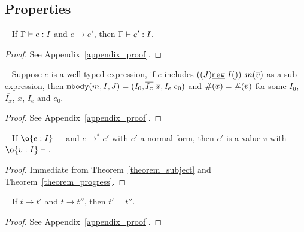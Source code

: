 \subsection{Properties}
\begin{theorem}~\label{theorem_subject}
If $\Gamma \; {\vdash} \; e : I$ and $e \rightarrow e'$, 
then $\Gamma \; {\vdash} \; e' : I$.
\end{theorem}
\begin{proof}
See Appendix~\ref{appendix_proof}.
\end{proof}

\begin{theorem}[Progress]~\label{theorem_progress}
Suppose $e$ is a well-typed expression, if $e$ includes 
$\left((J)\emph{\texttt{new}}\;I()\right).m(\overline{v})$ as a sub-expression, then $\texttt{mbody}(m, I, J) = (I_0, \overline{I_x} \; \overline{x}, I_e\; e_0)$ and $\#(\overline{x}) = \#(\overline{v})$ for some $I_0$, $\overline{I_x}$, $\overline{x}$, $I_e$ and $e_0$.
\end{theorem}
\begin{proof}
See Appendix~\ref{appendix_proof}.
\end{proof}

\begin{theorem}~\label{theorem_soundness}
If $\judgeewf \o {e : I}$ and $e \to^* e'$ with $e'$ a normal form, then $e'$ is 
a value $v$ with $\judgeewf \o {v:I}$.
\end{theorem}
\begin{proof}
Immediate from Theorem~\ref{theorem_subject} and Theorem~\ref{theorem_progress}.
\end{proof}

\begin{theorem}~\label{theorem_determinacy}
	If $t \to t'$ and $t \to t''$, then $t' = t''$.
\end{theorem}
\begin{proof}
See Appendix~\ref{appendix_proof}.
\end{proof}
